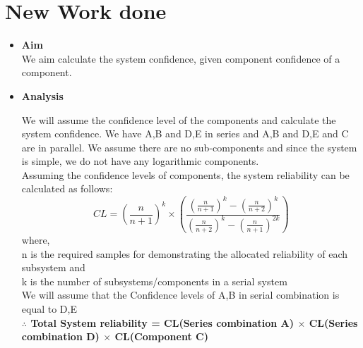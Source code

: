 \documentclass{article}
\begin{document}
\section{New Work done}
\begin{itemize}
    \item \textbf{Aim}\\
    We aim calculate the system confidence, given component confidence of a component.
    \item \textbf{Analysis}
    
     We will assume the confidence level of the components and calculate the system confidence.
     We have A,B and D,E in series and A,B and D,E and C are in parallel. We assume there are no sub-components and since the system is simple, we do not have any logarithmic components.\\
     Assuming the confidence levels of components, the system reliability can be calculated as follows:
     $$CL=(\frac{n}{n+1})^{k} \times (\frac{(\frac{n}{n+1})^k-(\frac{n}{n+2})^k}{(\frac{n}{n+2})^k-(\frac{n}{n+1})^{2k}})$$
where,\\
 n is the required samples for demonstrating the allocated reliability of each subsystem and \\
 k is the number of subsystems/components in a serial system\\
 We will assume that the Confidence levels of A,B in serial combination is equal to D,E\\
\textbf{ $\therefore$ Total System reliability = CL(Series combination A) $\times$ CL(Series combination D) $\times$ CL(Component C)} \\


\end{itemize}
\end{document}
